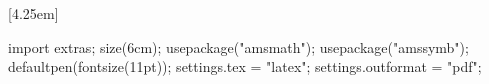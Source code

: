 \newtheorem{problem}{Problem}[chapter]
\renewcommand{\theproblem}{\thechapter\Alph{problem}}
\newtheorem{sproblem}[problem]{Problem}
\newtheorem{dproblem}[problem]{Problem}
\renewcommand{\thesproblem}{\theproblem$^{\star}$}
\renewcommand{\thedproblem}{\theproblem$^{\dagger}$}
\newcommand{\listhack}{$\empty$\vspace{-2em}}

\usepackage{answers}
\renewcommand{\solutionextension}{out}
\renewenvironment{answeritem}[1]{
\item[\bfseries #1.]}{}

\makeatletter
\usepackage{etoolbox}
%
\makeatother
\setcounter{tocdepth}{1}
\usepackage{titletoc}
[4.25em]                          %
{\vspace{0.25em}}                             %
{}                             %
{}                             %
{\contentspage}                             %

\usepackage{patch-asy}
\renewcommand{\theasy}{\thechapter\Alph{asy}}
\begin{asydef}
  import extras;
  size(6cm);
  usepackage("amsmath");
  usepackage("amssymb");
  defaultpen(fontsize(11pt));
  settings.tex = "latex";
  settings.outformat = "pdf";
\end{asydef}
\def\asydir{asy}

